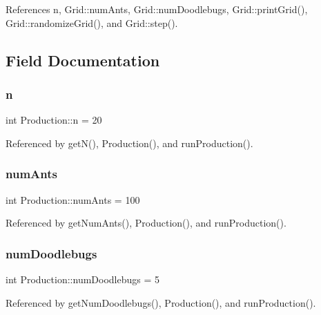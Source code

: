 References n, Grid\+::num\+Ants, Grid\+::num\+Doodlebugs, Grid\+::print\+Grid(), Grid\+::randomize\+Grid(), and Grid\+::step().



\subsection{Field Documentation}
\mbox{\label{classProduction_a33b15dfed0402031b26d5ebd6de3a864}} 
\subsubsection{n}
{\footnotesize\ttfamily int Production\+::n = 20\hspace{0.3cm}{\ttfamily [private]}}



Referenced by get\+N(), Production(), and run\+Production().

\mbox{\label{classProduction_a9bf1f5e66a3a787f08d37d5ef06cf8b6}} 
\subsubsection{num\+Ants}
{\footnotesize\ttfamily int Production\+::num\+Ants = 100\hspace{0.3cm}{\ttfamily [private]}}



Referenced by get\+Num\+Ants(), Production(), and run\+Production().

\mbox{\label{classProduction_a3bfd9e01f9f73efd1f92176e5f7458eb}} 
\subsubsection{num\+Doodlebugs}
{\footnotesize\ttfamily int Production\+::num\+Doodlebugs = 5\hspace{0.3cm}{\ttfamily [private]}}



Referenced by get\+Num\+Doodlebugs(), Production(), and run\+Production().

\mbox{\label{classProduction_a079f2c4ddd0af799fd4c11b7a96a3065}} 
